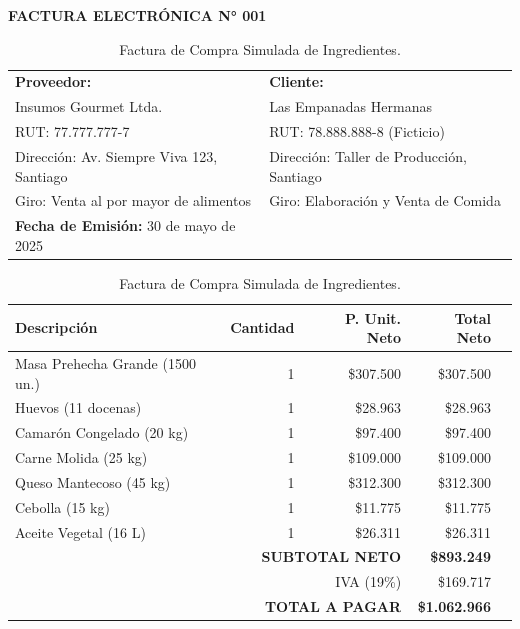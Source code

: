 \documentclass[12pt]{article}
\begin{document}
        \begin{table}[H]
            \centering
            \small
            \textbf{FACTURA ELECTRÓNICA N° 001} \\ %
            \begin{tabular}{|p{8cm}|p{6cm}|}
                \hline
                \textbf{Proveedor:} & \textbf{Cliente:} \\
                Insumos Gourmet Ltda. & Las Empanadas Hermanas \\
                RUT: 77.777.777-7 & RUT: 78.888.888-8 (Ficticio) \\
                Dirección: Av. Siempre Viva 123, Santiago & Dirección: Taller de Producción, Santiago \\
                Giro: Venta al por mayor de alimentos & Giro: Elaboración y Venta de Comida \\
                \hline
                \textbf{Fecha de Emisión:} 30 de mayo de 2025 & \\
                \hline
            \end{tabular}
            \vspace{0.3cm}
            
            \begin{tabular}{|l|r|r|r|r|}
                \hline
                \textbf{Descripción} & \textbf{Cantidad} & \textbf{P. Unit. Neto} & \textbf{Total Neto} \\
                \hline
                Masa Prehecha Grande (1500 un.) & 1 & \$307.500 & \$307.500 \\
                Huevos (11 docenas) & 1 & \$28.963 & \$28.963 \\
                Camarón Congelado (20 kg) & 1 & \$97.400 & \$97.400 \\
                Carne Molida (25 kg) & 1 & \$109.000 & \$109.000 \\
                Queso Mantecoso (45 kg) & 1 & \$312.300 & \$312.300 \\
                Cebolla (15 kg) & 1 & \$11.775 & \$11.775 \\
                Aceite Vegetal (16 L) & 1 & \$26.311 & \$26.311 \\
                \hline
                \multicolumn{3}{|r|}{\textbf{SUBTOTAL NETO}} & \textbf{\$893.249} \\
                \multicolumn{3}{|r|}{IVA (19\%)} & \$169.717 \\
                \multicolumn{3}{|r|}{\textbf{TOTAL A PAGAR}} & \textbf{\$1.062.966} \\
                \hline
            \end{tabular}
            \caption{Factura de Compra Simulada de Ingredientes.}
            \label{tab:factura_compra}
        \end{table}
    \newpage
\end{document}

